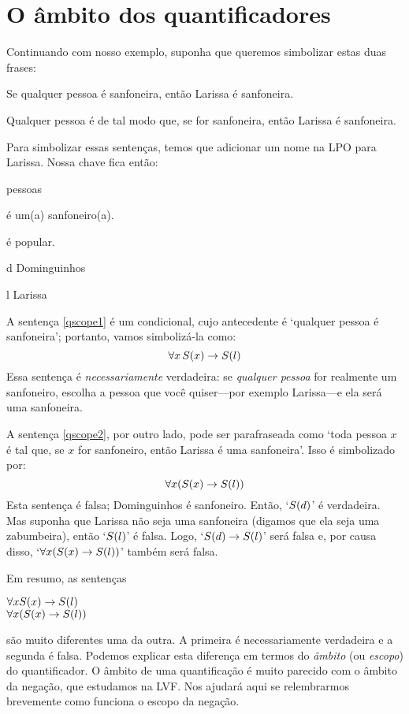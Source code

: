 \section{O âmbito dos quantificadores}\label{SecaoAmbito}
Continuando com nosso exemplo, suponha que queremos simbolizar estas duas frases:
	\begin{earg}
		\item[\ex{qscope1}] Se qualquer pessoa é sanfoneira, então Larissa é sanfoneira.
		\item[\ex{qscope2}] Qualquer pessoa é de tal modo que, se for sanfoneira, então Larissa é  sanfoneira.
	\end{earg}
Para simbolizar essas sentenças, temos que adicionar um nome na LPO para Larissa.
Nossa chave fica então:
	\begin{center}
	\begin{ekey}
		\item[\text{domínio}] pessoas
		\item[\atom{S}{x}]  é um(a) sanfoneiro(a).
		\item[\atom{P}{x}]  é popular.
		\item[d] Dominguinhos
		\item[l] Larissa
	\end{ekey}
	\end{center}
A sentença \ref{qscope1} é um condicional, cujo antecedente é `qualquer pessoa é sanfoneira'; portanto, vamos simbolizá-la como:
$$\forall x\, \mathord{S}(x) \rightarrow \mathord{S}(l)$$
Essa sentença é \emph{necessariamente} verdadeira:
se \emph{qualquer pessoa} for realmente um sanfoneiro, escolha a pessoa que você quiser---por exemplo Larissa---e ela será uma sanfoneira.

A sentença \ref{qscope2}, por outro lado, pode ser parafraseada como `toda pessoa $x$ é tal que, se $x$ for sanfoneiro, então Larissa é uma sanfoneira'. Isso é simbolizado por:
$$\forall x (\mathord{S}(x) \rightarrow \mathord{S}(l))$$
Esta sentença é falsa; Dominguinhos é sanfoneiro.
Então, `$\mathord{S}(d)$' é verdadeira. 
Mas suponha que Larissa não seja uma sanfoneira (digamos que ela seja  uma zabumbeira), então `$\mathord{S}(l)$' é falsa.
Logo, `$\mathord{S}(d) \rightarrow \mathord{S}(l)$' será falsa e, por causa disso, \mbox{`$\forall x (\mathord{S}(x) \rightarrow \mathord{S}(l))$'} também será falsa.

Em resumo, as sentenças
\begin{center}
	$\forall x \mathord{S}(x) \rightarrow \mathord{S}(l)$ \\ $\forall x (\mathord{S}(x) \rightarrow \mathord{S}(l))$
\end{center} 
são muito diferentes uma da outra.
A primeira é necessariamente verdadeira e a segunda é falsa.
Podemos explicar esta diferença em termos do \emph{âmbito} (ou \emph{escopo}) do quantificador.
O âmbito de uma quantificação é muito parecido com o âmbito da negação, que estudamos na LVF.
Nos ajudará aqui se relembrarmos brevemente como funciona o escopo da negação.

